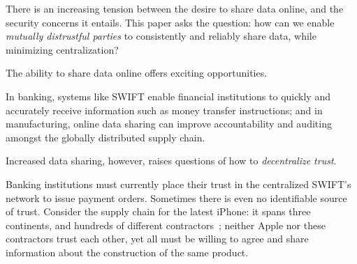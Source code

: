 
There is an increasing tension between the desire to share data online, and the security concerns it entails.
This paper asks the question: how can we enable \textit{mutually distrustful parties} to consistently and reliably
share data, while minimizing centralization?

The ability to share data online offers exciting opportunities.
\iffalse %
In the medical domain, for
instance, cloud-based solutions for managing health record offer doctors increased fault-tolerance at lower
cost, and offer patient an easier path to share their medical
history with their entire treatment teams, even when on the road. Opportunities abound in other areas too.
\fi
In banking, systems like SWIFT enable financial institutions to quickly and accurately receive information
such as money transfer instructions; and in manufacturing, online data sharing can improve accountability
and auditing amongst the globally distributed supply chain.

Increased data sharing, however, raises questions of how to \textit{decentralize trust}.
\iffalse
Even when medical records are
encrypted or anonymized, cloud providers or dishonest applications may be able to acquire
sensitive information: for example, tracking the charts accessed by an oncologist can reveal not only whether
a patient has cancer, but also, depending on the frequency of accesses (e.g., the frequency of chemotherapy
appointments), indicate the cancers type and severity.
\fi
Banking institutions must currently place their trust
in the centralized SWIFT’s network to issue payment orders. Sometimes there is even no identifiable source of
trust. Consider the supply chain for the latest iPhone: it spans three continents, and hundreds of different
contractors~\cite{}; neither Apple nor these contractors trust each other, yet all must be willing to agree and share
information about the construction of the same product.


\iffalse %
\Yunhao{If I understand correctly, the medical record example is for privacy,
  the banking and the manufacturing example are for trust.
  I can see how BFT solves the later by decentralizing trust, but I cannot
  see how BFT solves the privacy problem. The access pattern of each transaction is visible to all parties.}
\fi

